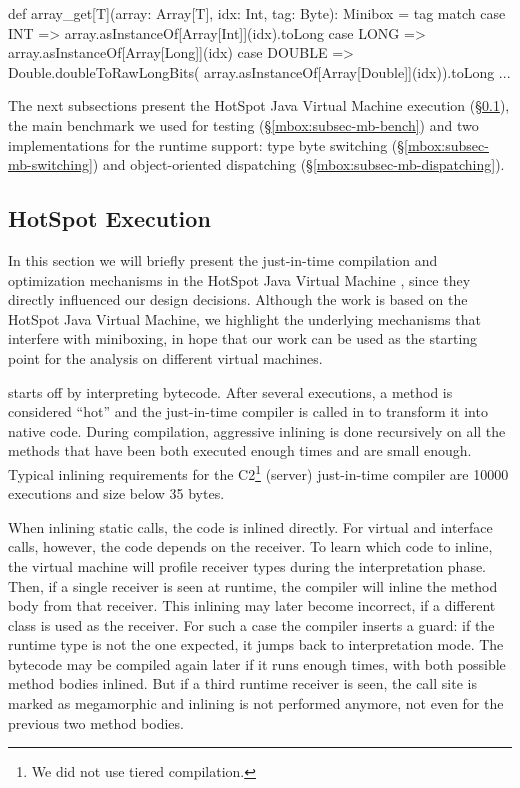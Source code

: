 \begin{lstlisting-nobreak}
 def array_get[T](array: Array[T], idx: Int, tag: Byte): Minibox = tag match {
   case INT =>
     array.asInstanceOf[Array[Int]](idx).toLong
   case LONG =>
     array.asInstanceOf[Array[Long]](idx)
   case DOUBLE =>  Double.doubleToRawLongBits(
     array.asInstanceOf[Array[Double]](idx)).toLong
   ...
 }
\end{lstlisting-nobreak}

 The next subsections present the HotSpot Java Virtual Machine execution (\S\ref{mbox:subsec-mb-jvm}), the main benchmark we used for testing (\S\ref{mbox:subsec-mb-bench}) and two implementations for the runtime support: type byte switching (\S\ref{mbox:subsec-mb-switching}) and object-oriented dispatching (\S\ref{mbox:subsec-mb-dispatching}).

\subsection{HotSpot Execution}
\label{mbox:subsec-mb-jvm}

 In this section we will briefly present the just-in-time compilation and optimization me\-cha\-ni\-sms in the HotSpot Java Virtual Machine \cite{hotspot-c1, hotspot-c2}, since they directly influenced our design decisions. Although the work is based on the HotSpot Java Virtual Machine, we highlight the underlying mechanisms that interfere with miniboxing, in hope that our work can be used as the starting point for the a\-na\-ly\-sis on different virtual machines. %

 starts off by interpreting bytecode. After several executions, a method is considered ``hot'' and the just-in-time compiler is called in to transform it into native code. During compilation, aggressive inlining is done recursively on all the methods that have been both executed enough times and are small enough. Typical inlining requirements for the C2\footnote{We did not use tiered compilation.} (server) just-in-time compiler are 10000 executions and size below 35 bytes.

When inlining static calls, the code is inlined directly. For virtual and interface calls, however, the code depends on the receiver. To learn which code to inline, the virtual machine will profile receiver types during the interpretation phase. Then, if a single receiver is seen at runtime, the compiler will inline the method body from that receiver. This inlining may later become incorrect, if a different class is used as the receiver. For such a case the compiler inserts a guard: if the runtime type is not the one expected, it jumps back to interpretation mode. The bytecode may be compiled again later if it runs enough times, with both possible method bodies inlined. But if a third runtime receiver is seen, the call site is marked as megamorphic and inlining is not performed anymore, not even for the previous two method bodies.

